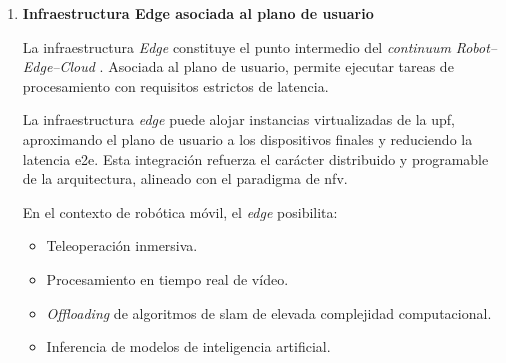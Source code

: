 \begin{enumerate}
    El núcleo \gls{5g} implementa las funciones del plano de control (\textit{Control Plane}) y del plano de usuario (\textit{User Plane}). El núcleo sigue una arquitectura \gls{sba}, propia de \gls{5gsa}, lo que permite la virtualización y desacoplamiento de funciones de red sobre infraestructura de propósito general.

    Estas funciones pueden ejecutarse de forma virtualizada tanto en infraestructura \textit{Edge} como en \textit{Cloud}, tal y como se representa en la Figura~\ref{fig:arquitectura_5Gsa}.

    La posibilidad de instanciar múltiples \gls{upf} habilita mecanismos de \textit{network slicing} a nivel de \textit{core}, permitiendo:

    \begin{itemize}
        \item Aislar tráfico por aplicación.
        \item Implementar políticas de QoS diferenciadas.
        \item Aproximar el plano de usuario al \textit{Edge}.
    \end{itemize}

    En sistemas distribuidos basados en \gls{ros} con estrategias de \textit{offloading}, la proximidad de la \gls{upf} a los nodos \textit{Edge} reduce la latencia \gls{e2e} en la transmisión de \textit{topics} de alta tasa, lo que resulta determinante en aplicaciones sensibles al retardo.

    \item \textbf{Infraestructura Edge asociada al plano de usuario}

    La infraestructura \textit{Edge} constituye el punto intermedio del \textit{continuum} 	\textit{Robot--Edge--Cloud} \cite{CrespoAguado2024IoTEdgeCloud}. Asociada al plano de usuario, permite ejecutar tareas de procesamiento con requisitos estrictos de latencia.

    La infraestructura \textit{edge} puede alojar instancias virtualizadas de la \gls{upf}, aproximando el plano de usuario a los dispositivos finales y reduciendo la latencia \gls{e2e}. Esta integración refuerza el carácter distribuido y programable de la arquitectura, alineado con el paradigma de \gls{nfv}.

    En el contexto de robótica móvil, el \textit{edge} posibilita:

    \begin{itemize}
        \item Teleoperación inmersiva.
        \item Procesamiento en tiempo real de vídeo.
        \item \textit{Offloading} de algoritmos de \gls{slam} de elevada complejidad computacional.
        \item Inferencia de modelos de inteligencia artificial.
    \end{itemize}


\end{enumerate}
